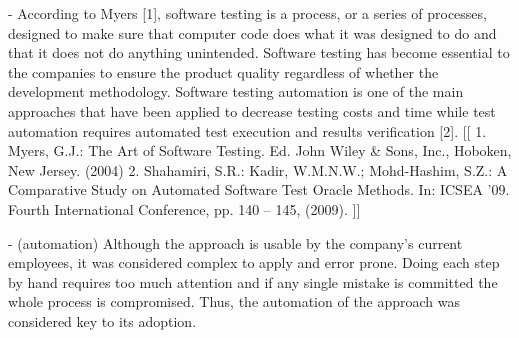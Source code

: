 \documentclass[runningheads,a4paper]{llncs}
\begin{document}
- According to Myers [1], software testing is a process, or a series of processes,
designed to make sure that computer code does what it was designed to do and that it
does not do anything unintended. Software testing has become essential to the
companies to ensure the product quality regardless of whether the development
methodology. Software testing automation is one of the main approaches that
have been applied to decrease testing costs and time while test automation
requires automated test execution and results verification [2].
[[
1. Myers, G.J.: The Art of Software Testing. Ed. John Wiley & Sons, Inc., Hoboken, New
Jersey. (2004)
2. Shahamiri, S.R.: Kadir, W.M.N.W.; Mohd-Hashim, S.Z.: A Comparative Study on
Automated Software Test Oracle Methods. In: ICSEA '09. Fourth International Conference,
pp. 140 – 145, (2009).
]]

- (automation) Although the approach is usable by the company’s current employees, it was
considered complex to apply and error prone. Doing each step by hand requires
too much attention and if any single mistake is committed the whole process is
compromised. Thus, the automation of the approach was considered key to its
adoption.
\end{document}
